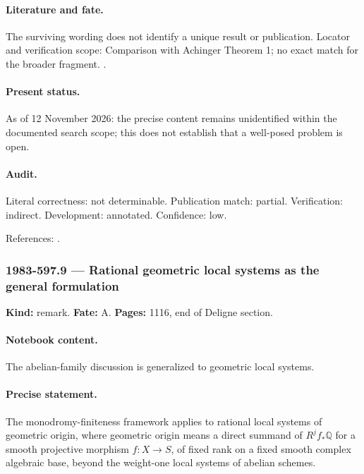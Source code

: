 \paragraph{Literature and fate.} The surviving wording does not identify a unique result or publication. Locator and verification scope: Comparison with Achinger Theorem 1; no exact match for the broader fragment. \cite{deligne1987finitude,achinger2018monodromy}.

\paragraph{Present status.} As of 12 November 2026: the precise content remains unidentified within the documented search scope; this does not establish that a well-posed problem is open.

\paragraph{Audit.} Literal correctness: not determinable. Publication match: partial. Verification: indirect. Development: annotated. Confidence: low.

\noindent References: \citep{deligne1987finitude,achinger2018monodromy}.\par

\subsubsection{1983-597.9 --- Rational geometric local systems as the general formulation}

\label{item:1983-597.9}

\noindent\textbf{Kind:} remark. \textbf{Fate:} A. \textbf{Pages:} 1116, end of Deligne section.\par

\paragraph{Notebook content.} The abelian-family discussion is generalized to geometric local systems.

\paragraph{Precise statement.} The monodromy-finiteness framework applies to rational local systems of geometric origin, where geometric origin means a direct summand of \(R^jf_*\mathbb Q\) for a smooth projective morphism \(f:X\to S\), of fixed rank on a fixed smooth complex algebraic base, beyond the weight-one local systems of abelian schemes.

